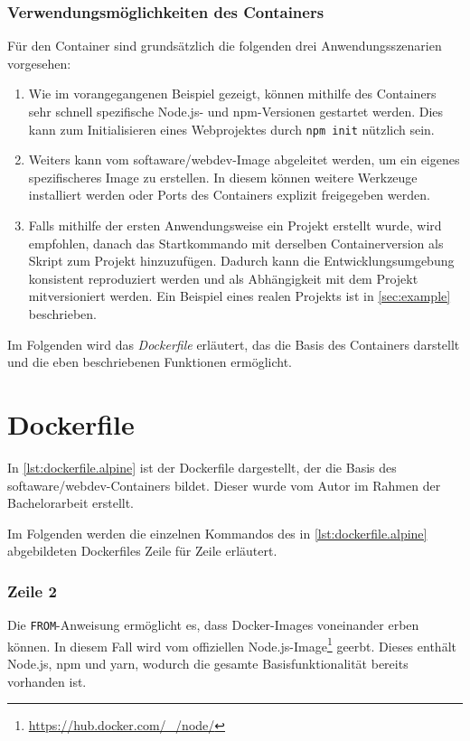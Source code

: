 \subsubsection{Verwendungsmöglichkeiten des Containers}
Für den Container sind grundsätzlich die folgenden drei Anwendungsszenarien vorgesehen:

\begin{enumerate}
    \item Wie im vorangegangenen Beispiel gezeigt, können mithilfe des Containers sehr schnell spezifische Node.js- und npm-Versionen gestartet werden.
        Dies kann \zB zum Initialisieren eines Webprojektes durch \verb|npm init| nützlich sein.
    \item Weiters kann vom softaware/webdev-Image abgeleitet werden, um ein eigenes spezifischeres Image zu erstellen.
        In diesem können \zB weitere Werkzeuge installiert werden oder Ports des Containers explizit freigegeben werden. 
    \item Falls mithilfe der ersten Anwendungsweise ein Projekt erstellt wurde, wird empfohlen, danach das Startkommando mit derselben Containerversion als Skript zum Projekt hinzuzufügen.
        Dadurch kann die Entwicklungsumgebung konsistent reproduziert werden und als Abhängigkeit mit dem Projekt mitversioniert werden.
        Ein Beispiel eines realen Projekts ist in \cref{sec:example} beschrieben.
\end{enumerate}
Im Folgenden wird das \emph{Dockerfile} erläutert, das die Basis des Containers darstellt und die eben beschriebenen Funktionen ermöglicht.

\section{Dockerfile}
\label{sec:dockerfile}
In \cref{lst:dockerfile.alpine} ist der Dockerfile dargestellt, der die Basis des softaware/webdev-Containers bildet.
Dieser wurde vom Autor im Rahmen der Bachelorarbeit erstellt.


Im Folgenden werden die einzelnen Kommandos des in \cref{lst:dockerfile.alpine} abgebildeten Dockerfiles Zeile für Zeile erläutert.

\subsubsection{Zeile 2}
Die \verb|FROM|-Anweisung ermöglicht es, dass Docker-Images voneinander erben können.
In diesem Fall wird vom offiziellen Node.js-Image\footnote{\url{https://hub.docker.com/_/node/}} geerbt.
Dieses enthält Node.js, npm und yarn, wodurch die gesamte Basisfunktionalität bereits vorhanden ist.

